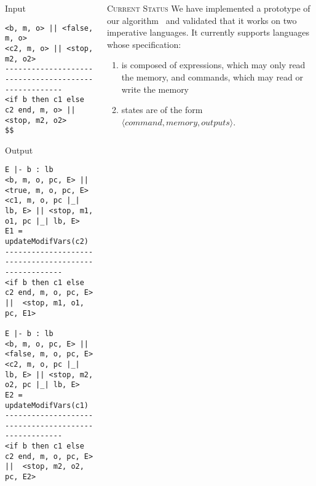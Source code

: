 \documentclass[final]{beamer}
\newlength{\onecolwid}
\newlength{\twocolwid}
\begin{document}
\begin{frame}[fragile]
\begin{columns}[t]
\begin{column}{\twocolwid}
\begin{minipage}[t]{0.48\linewidth}
\begin{alertblock}{Input}
\begin{lstlisting}
<b, m, o> || <false, m, o>
<c2, m, o> || <stop, m2, o2>
-----------------------------------------------------
<if b then c1 else c2 end, m, o> || <stop, m2, o2>
$$
\end{lstlisting}        
\end{alertblock}
\end{minipage}
\hfill%
\begin{minipage}[t]{0.48\linewidth}
\begin{alertblock}{Output}
\begin{lstlisting}
E |- b : lb
<b, m, o, pc, E> || <true, m, o, pc, E>
<c1, m, o, pc |_| lb, E> || <stop, m1, o1, pc |_| lb, E>
E1 = updateModifVars(c2)
-----------------------------------------------------
<if b then c1 else c2 end, m, o, pc, E> ||  <stop, m1, o1, pc, E1>

E |- b : lb
<b, m, o, pc, E> || <false, m, o, pc, E>
<c2, m, o, pc |_| lb, E> || <stop, m2, o2, pc |_| lb, E>
E2 = updateModifVars(c1)
-----------------------------------------------------
<if b then c1 else c2 end, m, o, pc, E> ||  <stop, m2, o2, pc, E2>
\end{lstlisting}
\end{alertblock}
\end{minipage}








\end{column}

\begin{column}{\onecolwid}

\begin{block}{\textsc{Current Status}}
We have implemented a prototype of our algorithm~\cite{GitHub:ott-ifc} and validated that it works on two imperative languages. It currently supports languages whose specification: 
\begin{enumerate}
\item is composed of expressions, which may only read the memory, and commands, which may read or write the memory
\item states are of the form $\langle command, memory, outputs\rangle$. 
\end{enumerate}


\end{block}
\end{column}
\end{columns}
\end{frame}
\end{document}
